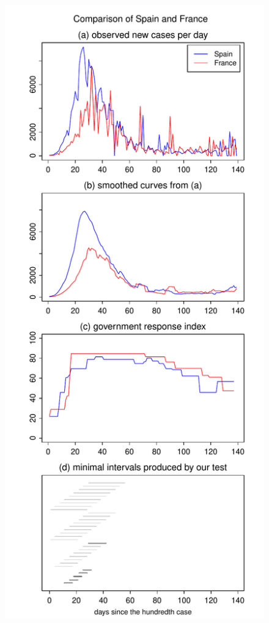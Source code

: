 \documentclass[a4paper,12pt]{article}
\numberwithin{equation}{section}
\begin{document}
\begin{figure}[p!]
\begin{minipage}[t]{0.49\textwidth}
\includegraphics[width=\textwidth]{plots/ESP_vs_FRA}

\end{minipage}
\end{figure}
\end{document}
